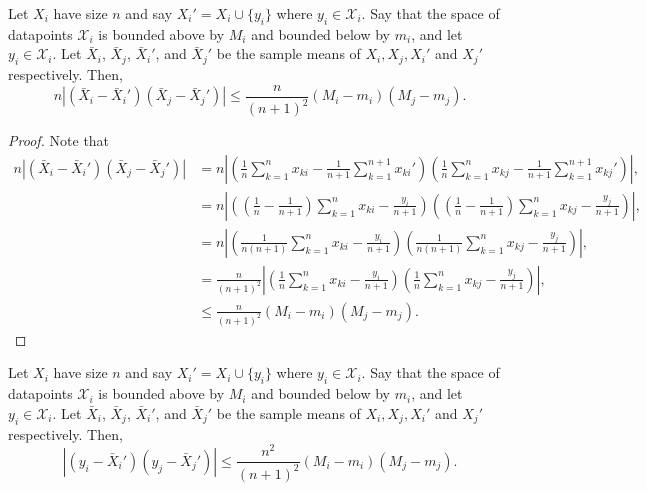 \documentclass[11pt]{scrartcl} %
\begin{document}
\begin{lemma}
\label{lemma:term1bound}
Let  $X_i$ have size $n$ and say $X_i' = X_i \cup \{y_i\}$ where $y_i \in \mathcal{X}_i.$ Say that the space of datapoints $\mathcal{X}_i$ is bounded above by $M_i$ and bounded below by $m_i$, and let $y_i \in \mathcal{X}_i.$ Let  $\bar{X}_i$, $\bar{X}_j$, $\bar{X}_i'$, and $\bar{X}_j'$ be the sample means of $X_i, X_j, X_i'$ and $X_j'$ respectively. Then,
$$ n \left\vert (\bar{X}_i - \bar{X}_i')(\bar{X}_j - \bar{X}_j') \right\vert \le \frac{n}{(n+1)^2}(M_i - m_i)(M_j - m_j).$$
\end{lemma}

\begin{proof}
Note that
\begin{align*}
 n \left\vert (\bar{X}_i - \bar{X}_i')(\bar{X}_j - \bar{X}_j') \right\vert &= n\left\vert \left( \frac{1}{n} \sum_{k=1}^n x_{ki} - \frac{1}{n+1} \sum_{k=1}^{n+1} x_{ki}' \right) \left( \frac{1}{n} \sum_{k=1}^n x_{kj} - \frac{1}{n+1} \sum_{k=1}^{n+1} x_{kj}' \right)\right\vert, \\
 	&= n \left\vert \left( \left(\frac{1}{n} - \frac{1}{n+1}\right) \sum_{k=1}^n x_{ki} - \frac{y_i}{n+1} \right)\left( \left(\frac{1}{n} - \frac{1}{n+1}\right) \sum_{k=1}^n x_{kj} - \frac{y_j}{n+1} \right) \right\vert, \\
	&= n  \left\vert \left(\frac{1}{n(n+1)} \sum_{k=1}^n x_{ki} - \frac{y_i}{n+1} \right)\left( \frac{1}{n(n+1)} \sum_{k=1}^n x_{kj} - \frac{y_j}{n+1} \right) \right\vert, \\
	&= \frac{n}{(n+1)^2} \left\vert \left( \frac{1}{n} \sum_{k=1}^n x_{ki} - \frac{y_i}{n+1} \right)\left( \frac{1}{n} \sum_{k=1}^n x_{kj} - \frac{y_j}{n+1} \right) \right\vert,\\
	&\le \frac{n}{(n+1)^2} (M_i - m_i)(M_j - m_j).
 \end{align*}
\end{proof}

\begin{lemma}
\label{lemma:term2bound}
Let  $X_i$ have size $n$ and say $X_i' = X_i \cup \{y_i\}$ where $y_i \in \mathcal{X}_i.$ Say that the space of datapoints $\mathcal{X}_i$ is bounded above by $M_i$ and bounded below by $m_i$, and let $y_i \in \mathcal{X}_i.$ Let  $\bar{X}_i$, $\bar{X}_j$, $\bar{X}_i'$, and $\bar{X}_j'$ be the sample means of $X_i, X_j, X_i'$ and $X_j'$ respectively. Then,
$$ \left\vert (y_i - \bar{X}_i')(y_j - \bar{X}_j') \right\vert \le \frac{n^2}{(n+1)^2}(M_i - m_i)(M_j-m_j).$$
\end{lemma}
\end{document}
